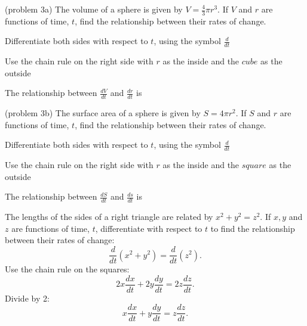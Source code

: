 \documentclass{ximera}
\begin{document}
\begin{problem}(problem 3a)
The volume of a sphere is given by $V = \tfrac{4}{3}\pi r^3$. If $V$ and $r$ are functions of time, $t$,
find the relationship between their rates of change.\\
\begin{hint}
Differentiate both sides with respect to $t$, using the symbol $\frac{d}{dt}$
\end{hint}
\begin{hint}
Use the chain rule on the right side with $r$ as the inside and the $cube$ as the outside
\end{hint}

The relationship between $\frac{dV}{dt}$ and $\frac{dr}{dt}$ is
\begin{multipleChoice}
\end{multipleChoice}
\end{problem}


\begin{problem}(problem 3b)
The surface area of a sphere is given by $S = 4\pi r^2$. If $S$ and $r$ are functions of time, $t$, 
find the relationship between their rates of change.\\
\begin{hint}
Differentiate both sides with respect to $t$, using the symbol $\frac{d}{dt}$
\end{hint}
\begin{hint}
Use the chain rule on the right side with $r$ as the inside and the $square$ as the outside
\end{hint}

The relationship between $\frac{dS}{dt}$ and $\frac{ds}{dt}$ is
\begin{multipleChoice}
\end{multipleChoice}
\end{problem}



\begin{example}[example 4]
The lengths of the sides of a right triangle are related by $x^2 + y^2 = z^2$. 
If $x, y$ and $z$ are functions of time, $t$, 
differentiate with respect to $t$ to find the relationship between their rates of change:
\[\frac{d}{dt} (x^2 + y^2 ) = \frac{d}{dt}( z^2).\]
Use the chain rule on the squares:
\[2x\frac{dx}{dt} + 2y\frac{dy}{dt} = 2z\frac{dz}{dt}.\]
Divide by 2:
\[x\frac{dx}{dt} + y\frac{dy}{dt} = z\frac{dz}{dt}.\]
\end{example}
\end{document}
